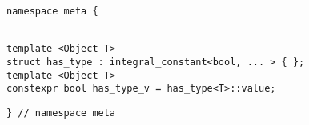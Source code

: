 
\begin{verbatim}
namespace meta {
\end{verbatim}
\begin{verbatim}

template <Object T>
struct has_type : integral_constant<bool, ... > { };
template <Object T>
constexpr bool has_type_v = has_type<T>::value;

\end{verbatim}
\begin{verbatim}
} // namespace meta
\end{verbatim}
